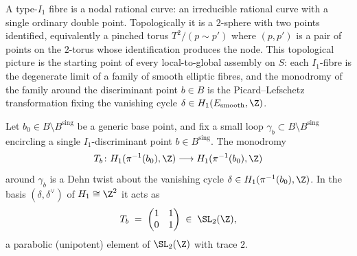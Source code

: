 \begin{remark}
\label{gluing:rem:I1-pinched-torus}
A type-$I_1$ fibre is a nodal rational curve: an irreducible rational
curve with a single ordinary double point. Topologically it is a
$2$-sphere with two points identified, equivalently a pinched torus
$T^2 / (p \sim p')$ where $(p, p')$ is a pair of points on the
$2$-torus whose identification produces the node. This topological
picture is the starting point of every local-to-global assembly on
$S$: each $I_1$-fibre is the degenerate limit of a family of smooth
elliptic fibres, and the monodromy of the family around the
discriminant point $b \in B$ is the Picard--Lefschetz transformation
fixing the vanishing cycle $\delta \in H_1(E_{\text{smooth}}, \Z)$.
\end{remark}

\begin{proposition}
\label{gluing:prop:picard-lefschetz}
Let $b_0 \in B \setminus B^{\mathrm{sing}}$ be a generic base point, and
fix a small loop $\gamma_b \subset B \setminus B^{\mathrm{sing}}$
encircling a single $I_1$-discriminant point $b \in B^{\mathrm{sing}}$.
The monodromy
\[
 T_b \colon H_1(\pi^{-1}(b_0), \Z) \longrightarrow
 H_1(\pi^{-1}(b_0), \Z)
\]
around $\gamma_b$ is a Dehn twist about the vanishing cycle $\delta \in
H_1(\pi^{-1}(b_0), \Z)$. In the basis $(\delta, \delta^{\vee})$ of $H_1
\cong \Z^2$ it acts as
\[
 T_b \;=\; \begin{pmatrix} 1 & 1 \\ 0 & 1 \end{pmatrix} \;\in\; \SL_2(\Z),
\]
a parabolic (unipotent) element of $\SL_2(\Z)$ with trace $2$.
\end{proposition}

